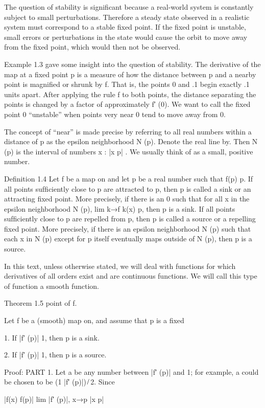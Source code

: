 The question of stability is signiﬁcant because a real-world system is constantly subject to small 
perturbations. Therefore a steady state observed in a realistic system must correspond to a stable ﬁxed 
point. If the ﬁxed point is unstable, small errors or perturbations in the state would cause the orbit to 
move away from the ﬁxed point, which would then not be observed.

Example 1.3 gave some insight into the question of stability. The derivative of the map at a ﬁxed point p 
is a measure of how the distance between p and a nearby point is magniﬁed or shrunk by f. That is, the 
points 0 and .1 begin exactly .1 units apart. After applying the rule f to both points, the distance 
separating the points is changed by a factor of approximately f′ (0). We want to call the ﬁxed point 0 
“unstable” when points very near 0 tend to move away from 0.

The concept of “near” is made precise by referring to all real numbers within a distance  of p as the 
epsilon neighborhood N  (p). Denote the real line by. Then N  (p) is the interval of numbers x  : |x  p|     
. We usually think of  as a small, positive number.

Deﬁnition 1.4 Let f be a map on and let p be a real number such that f(p)  p. If all points sufﬁciently 
close to p are attracted to p, then p is called a
sink or an attracting ﬁxed point. More precisely, if there is an    0 such that for all x in the epsilon 
neighborhood N  (p), lim k→f k(x)  p, then p is a sink. If all points sufﬁciently close to p are repelled 
from p, then p is called a source or a repelling ﬁxed point. More precisely, if there is an epsilon 
neighborhood N  (p) such that each x in N  (p) except for p itself eventually maps outside of N  (p), then 
p is a source.

In this text, unless otherwise stated, we will deal with functions for which derivatives of all orders 
exist and are continuous functions. We will call this type of function a smooth function.

Theorem 1.5 point of f.

Let f be a (smooth) map on, and assume that p is a ﬁxed

1. If |f′ (p)|   1, then p is a sink.

2. If |f′ (p)| 
 1, then p is a source.

Proof: PART 1. Let a be any number between |f′ (p)| and 1; for example, a could be chosen to be (1 |f′ 
(p)|) ̸ 2. Since

|f(x)  f(p)| lim  |f′ (p)|, x→p |x  p|


